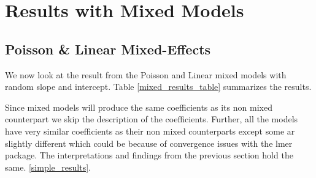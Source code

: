 \section{Results with Mixed Models}
\subsection{Poisson \& Linear Mixed-Effects}
We now look at the result from the Poisson and Linear mixed models with random slope and intercept. Table \ref{mixed_results_table} summarizes the results.

Since mixed models will produce the same coefficients as its non mixed counterpart we skip the description of the coefficients. Further, all the models have very similar coefficients as their non mixed counterparts except some ar slightly different which could be because of convergence issues with the lmer package. The interpretations and findings from the previous section hold the same. \ref{simple_results}.
